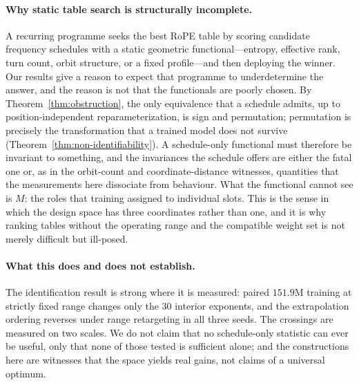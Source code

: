 
\paragraph{Why static table search is structurally incomplete.}
A recurring programme seeks the best RoPE table by scoring candidate frequency
schedules with a static geometric functional---entropy, effective rank, turn count,
orbit structure, or a fixed profile---and then deploying the winner. Our results
give a reason to expect that programme to underdetermine the answer, and the reason
is not that the functionals are poorly chosen. By Theorem~\ref{thm:obstruction},
the only equivalence that a schedule admits, up to position-independent
reparameterization, is sign and permutation; permutation is precisely the
transformation that a trained model does not survive
(Theorem~\ref{thm:non-identifiability}). A schedule-only functional must therefore
be invariant to something, and the invariances the schedule offers are either the
fatal one or, as in the orbit-count and coordinate-distance witnesses, quantities
that the measurements here dissociate from behaviour. What the functional cannot
see is $M$: the roles that training assigned to individual slots. This is the sense
in which the design space has three coordinates rather than one, and it is why
ranking tables without the operating range and the compatible weight set is not
merely difficult but ill-posed.


\paragraph{What this does and does not establish.}
The identification result is strong where it is measured: paired $151.9$M training
at strictly fixed range changes only the $30$ interior exponents, and the
extrapolation ordering reverses under range retargeting in all three seeds. The
crossings are measured on two scales. We do not claim that no schedule-only
statistic can ever be useful, only that none of those tested is sufficient alone;
and the constructions here are witnesses that the space yields real gains, not
claims of a universal optimum.
